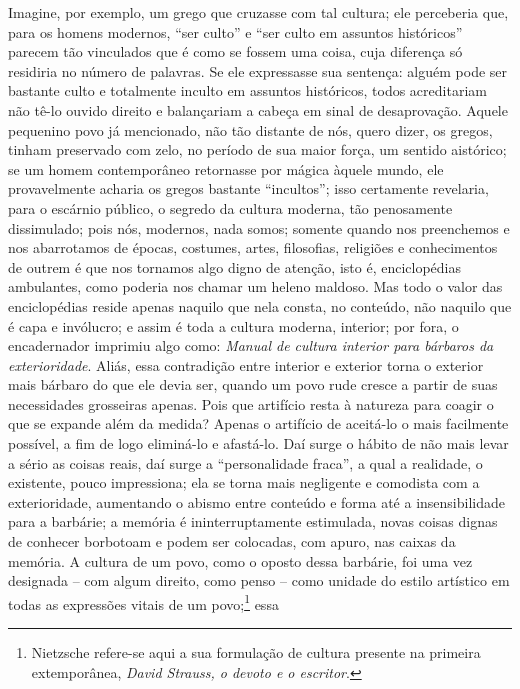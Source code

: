     Imagine, por exemplo, um grego que cruzasse com tal cultura; ele
    perceberia que, para os homens modernos, ``ser culto'' e ``ser culto
    em assuntos históricos'' parecem tão vinculados que é como se fossem
    uma coisa, cuja diferença só residiria no número de palavras. Se ele
    expressasse sua sentença: alguém pode ser bastante culto e
    totalmente inculto em assuntos históricos, todos acreditariam não
    tê-lo ouvido direito e balançariam a cabeça em sinal de
    desaprovação. Aquele pequenino povo já mencionado, não tão distante
    de nós, quero dizer, os gregos, tinham preservado com zelo, no
    período de sua maior força, um sentido aistórico; se um homem
    contemporâneo retornasse por mágica àquele mundo, ele provavelmente
    acharia os gregos bastante ``incultos''; isso certamente revelaria,
    para o escárnio público, o segredo da cultura moderna, tão
    penosamente dissimulado; pois nós, modernos, nada somos; somente
    quando nos preenchemos e nos abarrotamos de épocas, costumes, artes,
    filosofias, religiões e conhecimentos de outrem é que nos tornamos
    algo digno de atenção, isto é, enciclopédias ambulantes, como
    poderia nos chamar um heleno maldoso. Mas todo o valor das
    enciclopédias reside apenas naquilo que nela consta, no conteúdo,
    não naquilo que é capa e invólucro; e assim é toda a cultura
    moderna, interior; por fora, o encadernador imprimiu algo como:
    \emph{Manual de cultura interior para bárbaros da exterioridade}. Aliás,
    essa contradição entre interior e exterior torna o exterior mais
    bárbaro do que ele devia ser, quando um povo rude cresce a partir de
    suas necessidades grosseiras apenas. Pois que artifício resta à
    natureza para coagir o que se expande além da medida? Apenas o
    artifício de aceitá-lo o mais facilmente possível, a fim de logo
    eliminá-lo e afastá-lo. Daí surge o hábito de não mais levar a sério
    as coisas reais, daí surge a ``personalidade fraca'', a qual a
    realidade, o existente, pouco impressiona; ela se torna mais
    negligente e comodista com a exterioridade, aumentando o abismo
    entre conteúdo e forma até a insensibilidade para a barbárie; a
    memória é ininterruptamente estimulada, novas coisas dignas de
    conhecer borbotoam e podem ser colocadas, com apuro, nas caixas da
    memória. A cultura de um povo, como o oposto dessa barbárie, foi uma
    vez designada -- com algum direito, como penso -- como unidade do
    estilo artístico em todas as expressões vitais de um povo;\footnote{Nietz\-sche
      refere-se aqui a sua formulação de cultura presente na primeira
      extemporânea, \emph{David Strauss, o devoto e o escritor}.}\label{vitaisdeumpovo} essa

